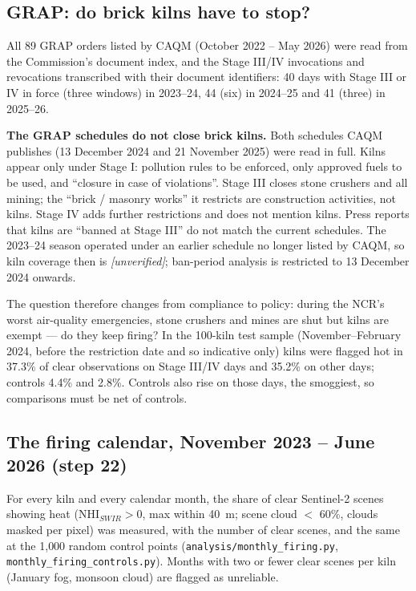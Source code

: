 \documentclass[11pt,a4paper]{article}
\newcommand{\status}[1]{\textcolor{kiln}{\small\textit{[#1]}}}
\begin{document}
\subsection{GRAP: do brick kilns have to stop?}
All 89 GRAP orders listed by CAQM (October 2022 -- May 2026) were read from the
Commission's document index, and the Stage III/IV invocations and revocations
transcribed with their document identifiers: 40 days with Stage III or IV in
force (three windows) in 2023--24, 44 (six) in 2024--25 and 41 (three) in
2025--26.

\textbf{The GRAP schedules do not close brick kilns.} Both schedules CAQM
publishes (13 December 2024 and 21 November 2025) were read in full. Kilns
appear only under Stage I: pollution rules to be enforced, only approved fuels
to be used, and ``closure in case of violations''. Stage III closes stone
crushers and all mining; the ``brick / masonry works'' it restricts are
construction activities, not kilns. Stage IV adds further restrictions and does
not mention kilns. Press reports that kilns are ``banned at Stage III'' do not
match the current schedules. The 2023--24 season operated under an earlier
schedule no longer listed by CAQM, so kiln coverage then is
\status{unverified}; ban-period analysis is restricted to 13 December 2024
onwards.

The question therefore changes from compliance to policy: during the NCR's
worst air-quality emergencies, stone crushers and mines are shut but kilns are
exempt --- do they keep firing? In the 100-kiln test sample (November--February
2024, before the restriction date and so indicative only) kilns were flagged hot
in 37.3\% of clear observations on Stage III/IV days and 35.2\% on other days;
controls 4.4\% and 2.8\%. Controls also rise on those days, the smoggiest, so
comparisons must be net of controls.

\subsection{The firing calendar, November 2023 -- June 2026 (step 22)}
For every kiln and every calendar month, the share of clear Sentinel-2 scenes
showing heat (NHI$_{SWIR} > 0$, max within 40~m; scene cloud $<$ 60\%, clouds
masked per pixel) was measured, with the number of clear scenes, and the same at
the 1{,}000 random control points (\texttt{analysis/monthly\_firing.py},
\texttt{monthly\_firing\_controls.py}). Months with two or fewer clear scenes
per kiln (January fog, monsoon cloud) are flagged as unreliable.
\end{document}
